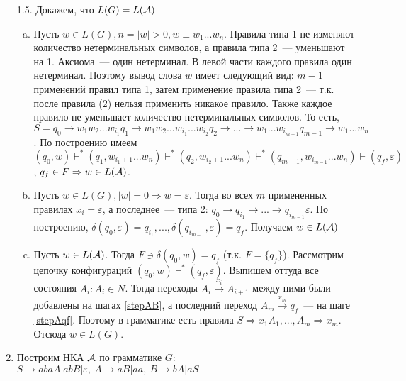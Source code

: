 \documentclass[a4paper]{article}
\def\A{{\cal A}}
\begin{document}
\begin{enumerate}
\begin{enumerate}[1.]
\begin{enumerate}[a.]
\begin{enumerate}[1.]
\end{enumerate}
\end{enumerate}
\end{enumerate}
\item[1.5.] Докажем, что $L(G)=L(\A)$\begin{enumerate}[a.]
\item Пусть $w\in L(G), n=|w|>0,w\equiv w_1...w_n$. Правила типа 1 не изменяют количество нетерминальных символов, а правила типа 2~--- уменьшают на 1. Аксиома~--- один нетерминал. В левой части каждого правила один нетерминал. Поэтому вывод слова $w$ имеет следующий вид: $m-1$ применений правил типа 1, затем применение правила типа 2~--- т.к. после правила (2) нельзя применить никакое правило. Также каждое правило не уменьшает количество нетерминальных символов. То есть, $S=q_0\longrightarrow w_1w_2...w_{i_1}q_1\longrightarrow w_1w_2...w_{i_1}...w_{i_2}q_2\longrightarrow...\longrightarrow w_1...w_{i_{m-1}}q_{m-1}\longrightarrow w_1...w_n$. По построению имеем $(q_0,w)\vdash^*(q_1,w_{i_1+1}...w_n)\vdash^*(q_2,w_{i_2+1}...w_n)\vdash^*(q_{m-1},w_{i_{m-1}}...w_n)\vdash(q_f,\varepsilon)$, $q_f\in F\Rightarrow w\in L(\A)$.
\item Пусть $w\in L(G), |w|=0\Rightarrow w=\varepsilon$. Тогда во всех $m$ примененных правилах $x_i=\varepsilon$, а последнее~--- типа 2: $q_0\longrightarrow q_{i_1}\longrightarrow...\longrightarrow q_{i_{m-1}} \varepsilon$. По построению, $\delta(q_0,\varepsilon)=q_{i_1},...,\delta(q_{i_{m-1}},\varepsilon)=q_f$. Получаем $w\in L(\A)$
\item Пусть $w\in L(\A)$. Тогда $F\ni\delta(q_0,w)=q_f$ (т.к. $F=\{q_f\}$). Рассмотрим цепочку конфигураций $(q_0,w)\vdash^*(q_f,\varepsilon)$. Выпишем оттуда все состояния $A_i\colon A_i\in N$. Тогда переходы $A_i\overset{x_i}{\longrightarrow}A_{i+1}$ между ними были добавлены на шагах \ref{stepAB}, а последний переход $A_m\overset{x_m}{\longrightarrow} q_f$~--- на шаге \ref{stepAqf}. Поэтому в грамматике есть правила $S\Rightarrow x_1A_1,...,A_m\Rightarrow x_m$. Отсюда $w\in L(G)$.
\end{enumerate}
\item Построим НКА $\A$ по грамматике $G$: $S\longrightarrow abaA|abB|\varepsilon,\ A\longrightarrow  aB|aa,\ B\longrightarrow bA|aS$
\begin{center}
\end{center}
\end{enumerate}
\end{document}
